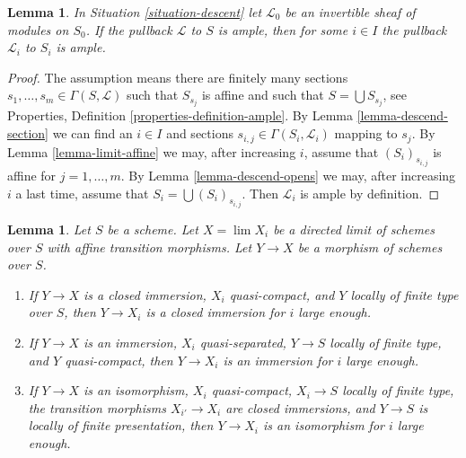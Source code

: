 \documentclass{stacks-project}
\theoremstyle{plain}
\newtheorem{lemma}[subsection]{Lemma}
\theoremstyle{definition}
\theoremstyle{remark}
\numberwithin{equation}{subsection}
\def\lim{\mathop{\mathrm{lim}}\nolimits}
\begin{document}
\begin{lemma}
\label{lemma-limit-ample}
In Situation \ref{situation-descent} let $\mathcal{L}_0$ be an invertible
sheaf of modules on $S_0$. If the pullback $\mathcal{L}$ to $S$ is ample,
then for some $i \in I$ the pullback $\mathcal{L}_i$ to $S_i$ is ample.
\end{lemma}

\begin{proof}
The assumption means there are finitely many sections
$s_1, \ldots, s_m \in \Gamma(S, \mathcal{L})$ such that
$S_{s_j}$ is affine and such that $S = \bigcup S_{s_j}$, see
Properties, Definition \ref{properties-definition-ample}.
By Lemma \ref{lemma-descend-section} we can find an $i \in I$
and sections $s_{i, j} \in \Gamma(S_i, \mathcal{L}_i)$ mapping to $s_j$.
By Lemma \ref{lemma-limit-affine} we may, after increasing $i$, assume
that $(S_i)_{s_{i, j}}$ is affine for $j = 1, \ldots, m$.
By Lemma \ref{lemma-descend-opens} we may, after increasing $i$ a
last time, assume that $S_i = \bigcup (S_i)_{s_{i, j}}$.
Then $\mathcal{L}_i$ is ample by definition.
\end{proof}

\begin{lemma}
\label{lemma-finite-type-eventually-closed}
Let $S$ be a scheme. Let $X = \lim X_i$ be a directed limit of
schemes over $S$ with affine transition morphisms. Let $Y \to X$
be a morphism of schemes over $S$.
\begin{enumerate}
\item If $Y \to X$ is a closed immersion, $X_i$ quasi-compact, and
$Y$ locally of finite type over $S$, then $Y \to X_i$ is a closed
immersion for $i$ large enough.
\item If $Y \to X$ is an immersion, $X_i$ quasi-separated, $Y \to S$ locally
of finite type, and $Y$ quasi-compact, then $Y \to X_i$ is an
immersion for $i$ large enough.
\item If $Y \to X$ is an isomorphism, $X_i$ quasi-compact,
$X_i \to S$ locally of finite type, the transition morphisms
$X_{i'} \to X_i$ are closed immersions, and $Y \to S$ is locally
of finite presentation, then $Y \to X_i$ is an isomorphism for $i$
large enough.
\end{enumerate}
\end{lemma}
\end{document}
